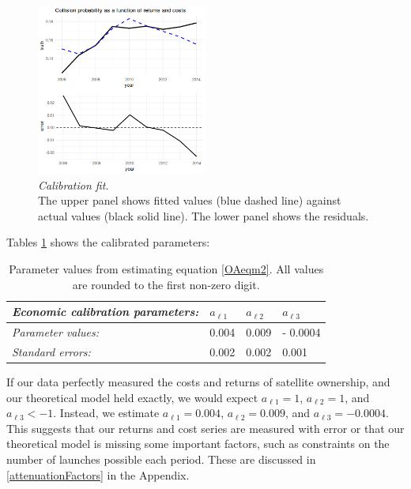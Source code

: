 \documentclass[12pt]{article}
\begin{document}
\begin{figure}[H]
	\centering
	\includegraphics[width=0.5\textwidth]{../../images/risk_return_plot.png}
	\captionsetup{format=hang}
	\caption{\textit{Calibration fit.} \\
		The upper panel shows fitted values (blue dashed line) against actual values (black solid line). The lower panel shows the residuals.
	}
	\label{econCalibration}
\end{figure}

Tables \ref{econParms} shows the calibrated parameters:

\begin{table}[H]
	\centering
	\begin{tabular}{|l|l|l|l|}
		\hline
		\textit{Economic calibration parameters:}      & \textbf{$a_{\ell 1}$} & \textbf{$a_{\ell 2}$} & \textbf{$a_{\ell 3}$} \\ \hline
		\textit{Parameter values:} & 0.004               & 0.009               & - 0.0004 \\ \hline
		\textit{Standard errors:} & 0.002 & 0.002 & 0.001 \\ \hline
	\end{tabular}
	\caption{Parameter values from estimating equation \ref{OAeqm2}. All values are rounded to the first non-zero digit.}
	\label{econParms}
\end{table}

If our data perfectly measured the costs and returns of satellite ownership, and our theoretical model held exactly, we would expect $a_{\ell 1}=1$, $a_{\ell 2} = 1$, and $a_{\ell 3} < -1$. Instead, we estimate $a_{\ell 1}=0.004$, $a_{\ell 2} = 0.009$, and $a_{\ell 3} = -0.0004$. This suggests that our returns and cost series are measured with error or that our theoretical model is missing some important factors, such as constraints on the number of launches possible each period. These are discussed in \ref{attenuationFactors} in the Appendix.\\
\end{document}
